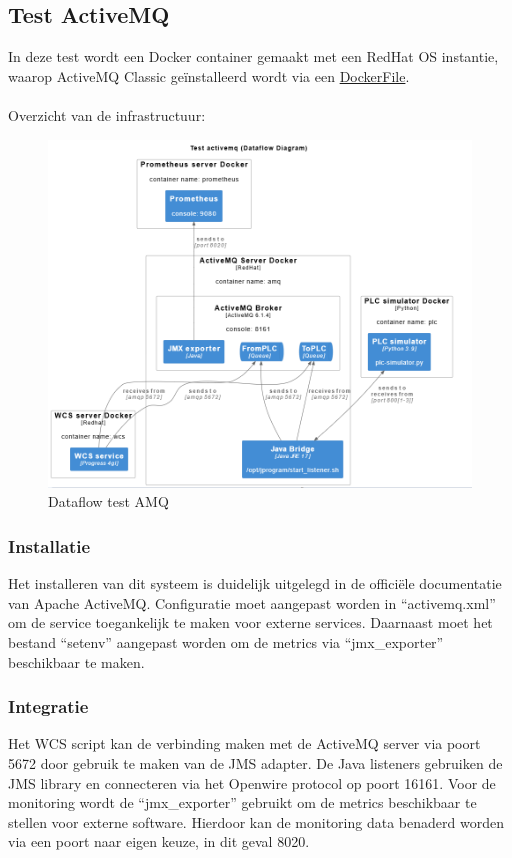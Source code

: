 \subsection{Test ActiveMQ}
In deze test wordt een Docker container gemaakt met een RedHat OS instantie, waarop ActiveMQ Classic 
geïnstalleerd wordt via een \hyperref[sec:codeamq]{DockerFile}.
\\\\
Overzicht van de infrastructuur:
\begin{figure}[h!]
  \centering
  \includegraphics[width=.9\textwidth]{img/test_amq_dataflow.png}
  \caption{\label{fig:test_amq_dataflow}Dataflow test AMQ}
\end{figure}

\subsubsection{Installatie}
Het installeren van dit systeem is duidelijk uitgelegd in de officiële documentatie van Apache ActiveMQ.
Configuratie moet aangepast worden in ``activemq.xml'' om de service toegankelijk te maken voor externe services.
Daarnaast moet het bestand ``setenv'' aangepast worden om de metrics via ``jmx\_exporter'' beschikbaar te maken.

\subsubsection{Integratie}
Het WCS script kan de verbinding maken met de ActiveMQ server via poort 5672 door gebruik te maken van de JMS adapter.
De Java listeners gebruiken de JMS library en connecteren via het Openwire protocol op poort 16161.
Voor de monitoring wordt de ``jmx\_exporter'' gebruikt om de metrics beschikbaar te stellen voor externe software.
Hierdoor kan de monitoring data benaderd worden via een poort naar eigen keuze, in dit geval 8020.

